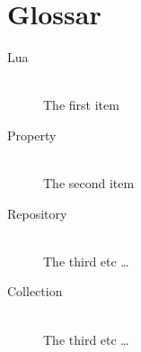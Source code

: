
\section{Glossar}

\begin{description}
  \item[Lua] \hfill \\
  The first item
  \item[Property] \hfill \\
  The second item
  \item[Repository] \hfill \\
  The third etc \ldots
  \item[Collection] \hfill \\
  The third etc \ldots
\end{description}
